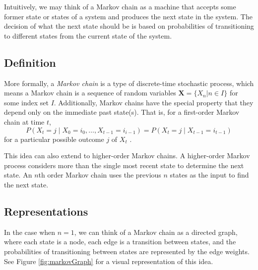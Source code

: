 Intuitively, we may think of a Markov chain as a machine that accepts some former state or states of a system and produces the next state in the system.
The decision of what the next state should be is based on probabilities of transitioning to different states from the current state of the system.

\subsection{Definition} \label{bg:markov:definitions}

More formally, a \textit{Markov chain} is a type of discrete-time stochastic process, which means a Markov chain is a sequence of random variables $\boldsymbol{X} = \{X_{n} | n \in I\}$ for some index set $I$.
Additionally, Markov chains have the special property that they depend only on the immediate past state(s).
That is, for a first-order Markov chain at time $t$, $$P(X_{t} = j \mid X_{0} = i_{0}, \ldots, X_{t - 1} = i_{i - 1}) = P(X_{t} = j \mid X_{t - 1} = i_{t - 1})$$ for a particular possible outcome $j$ of $X_{t}$ \cite{nierhaus_algorithmic_2009}.

This idea can also extend to higher-order Markov chains.
A higher-order Markov process considers more than the single most recent state to determine the next state.
An $n$th order Markov chain uses the previous $n$ states as the input to find the next state.

\subsection{Representations} \label{bg:markov:representations}

In the case when $n = 1$, we can think of a Markov chain as a directed graph, where each state is a node, each edge is a transition between states, and the probabilities of transitioning between states are represented by the edge weights.
See Figure \ref{fig:markovGraph} for a visual representation of this idea.

